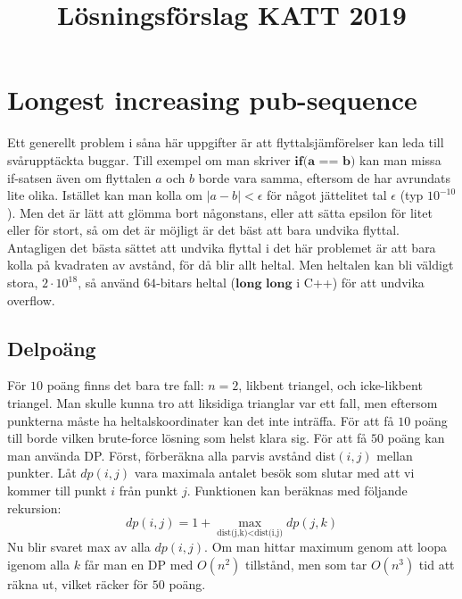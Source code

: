 \documentclass{article}
\title{Lösningsförslag KATT 2019}
\date{}
\begin{document}
\maketitle

\section*{Longest increasing pub-sequence}
Ett generellt problem i såna här uppgifter är att  flyttalsjämförelser kan leda till svårupptäckta buggar. Till exempel om man skriver $\textbf{if(a == b)}$ kan man missa if-satsen även om flyttalen $a$ och $b$ borde vara samma, eftersom de har avrundats lite olika. Istället kan man kolla om $|a-b| < \epsilon$ för något jättelitet tal $\epsilon$ (typ $10^{-10}$). Men det är lätt att glömma bort någonstans, eller att sätta epsilon för litet eller för stort, så om det är möjligt är det bäst att bara undvika flyttal.  Antagligen det bästa sättet att undvika flyttal i det här problemet är att bara kolla på kvadraten av avstånd, för då blir allt heltal. Men heltalen kan bli väldigt stora, $2\cdot10^{18}$, så använd $64$-bitars heltal ($\textbf{long long}$ i C++) för att undvika overflow.
\subsection*{Delpoäng}
För $10$ poäng finns det bara tre fall: $n = 2$, likbent triangel, och icke-likbent triangel. Man skulle kunna tro att liksidiga trianglar var ett fall, men eftersom punkterna måste ha heltalskoordinater kan det inte inträffa. För att få $10$ poäng till borde vilken brute-force lösning som helst klara sig. För att få $50$ poäng kan man använda DP. Först, förberäkna alla parvis avstånd dist$(i,j)$ mellan punkter. Låt $dp(i,j)$ vara maximala antalet besök som slutar med att vi kommer till punkt $i$ från punkt $j$. Funktionen kan beräknas med följande rekursion:
$$dp(i,j) = 1 + \max_{\text{dist(j,k)} < \text{dist(i,j)}}dp(j,k)$$
Nu blir svaret max av alla $dp(i,j)$. Om man hittar maximum genom att loopa igenom alla $k$ får man en DP med $O(n^2)$ tillstånd, men som tar $O(n^3)$ tid att räkna ut, vilket räcker för $50$ poäng.
\end{document}

